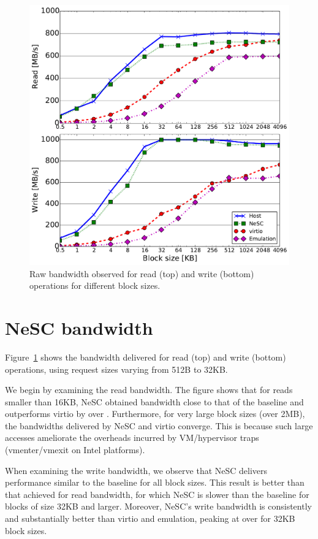 \begin{figure}[t]
  \centering
  \includegraphics[width=1\columnwidth]{figs/throughput_block_size.pdf}
  \caption{Raw bandwidth observed for read (top) and write (bottom) operations for different block sizes.}
  \label{fig:bw}
\end{figure}

\section*{NeSC bandwidth}
Figure~\ref{fig:bw} shows the bandwidth delivered for read (top) and write (bottom) operations, using request sizes varying from 512B to 32KB.

We begin by examining the read bandwidth.
%
The figure shows that for reads smaller than 16KB, NeSC obtained bandwidth close to that of the baseline and outperforms virtio by over .
%
Furthermore, for very large block sizes (over 2MB), the bandwidths delivered by NeSC and virtio converge. This is because such large accesses ameliorate the overheads incurred by VM/hypervisor traps (vmenter/vmexit on Intel platforms).

When examining the write bandwidth, we observe that NeSC delivers performance similar to the baseline for all block sizes. This result is better than that achieved for read bandwidth, for which NeSC is \tilde{} slower than  the baseline for blocks of size 32KB and larger. Moreover, NeSC's write bandwidth is consistently and substantially better than virtio and emulation, peaking at over  for 32KB block sizes.


